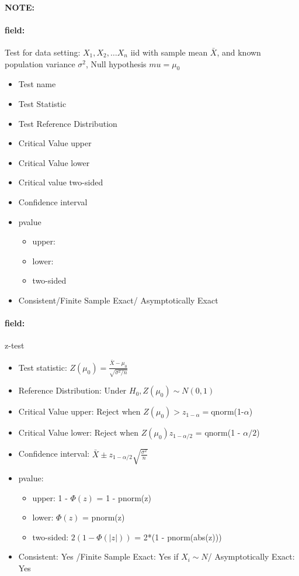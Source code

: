 \documentclass[12pt]{article}
\newenvironment{note}{\paragraph{NOTE:}}{}
\newenvironment{field}{\paragraph{field:}}{}
\begin{document}
\begin{note}
    \begin{field}
        Test for data setting: $X_1, X_2, \ldots X_n$ iid with sample mean $\bar{X}$, and known population variance $\sigma^2$, Null hypothesis $mu = \mu_0$

            \begin{itemize}
              \item Test name
              \item Test Statistic
              \item Test Reference Distribution
              \item Critical Value upper
              \item Critical Value lower
              \item Critical value two-sided
              \item Confidence interval
              \item pvalue
              \begin{itemize}
                \item upper:
                \item lower:
                \item two-sided
              \end{itemize}
              \item Consistent/Finite Sample Exact/ Asymptotically Exact
            \end{itemize}
    \end{field}
    \begin{field}
        z-test
            \begin{itemize}
              \item Test statistic: $Z(\mu_0) = \frac{\bar{X} - \mu_0}{\sqrt{\sigma^2/n}}$
              \item Reference Distribution: Under $H_0, Z(\mu_0) \sim N(0,1)$
              \item Critical Value upper: Reject when $Z(\mu_0) > z_{1 - \alpha} = $qnorm(1-$\alpha$)
              \item Critical Value lower: Reject when $Z(\mu_0) z_{1 - \alpha/2}$ = qnorm(1 - $\alpha/2$)
              \item Confidence interval: $ \bar{X} \pm z_{1 - \alpha/2}\sqrt{\frac{\sigma^2}{n}}$
              \item pvalue:
              \begin{itemize}
                \item upper: 1 - $\Phi(z)$ = 1 - pnorm(z)
                \item lower: $\Phi(z)$ = pnorm(z)
                \item two-sided: $2(1 - \Phi(|z|))$ = 2*(1 - pnorm(abs(z)))
              \end{itemize}
              \item Consistent: Yes /Finite Sample Exact: Yes if $X_i \sim N$/ Asymptotically Exact: Yes
            \end{itemize}
    \end{field}
\end{note}
\end{document}
